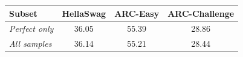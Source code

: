 \begin{tabular}{lccc}
\toprule
\textbf{Subset} & \textbf{HellaSwag} & \textbf{ARC-Easy} & \textbf{ARC-Challenge} \\
\midrule
\textit{Perfect only} & 36.05 & 55.39 & 28.86 \\
\textit{All samples}  & 36.14 & 55.21 & 28.44 \\
\bottomrule
\end{tabular}
